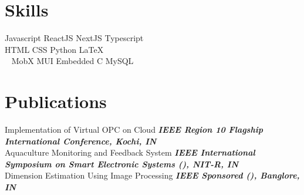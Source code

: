 \documentclass[]{deedy-resume-openfont}
\begin{document}
\begin{minipage}[t]{0.32\textwidth}




\section{Skills}
\vspace{1.5mm}
Javascript \textbullet{}   ReactJS \textbullet{} NextJS \textbullet{} Typescript \\
HTML \textbullet{} CSS \textbullet{} Python \textbullet{} \LaTeX\\\
MobX \textbullet{} MUI \textbullet{} Embedded C \textbullet{} MySQL
\sectionsep

\section{Publications}
Implementation of Virtual OPC on Cloud \textbullet{} 
{\footnotesize \textit{\textbf{ IEEE Region 10 Flagship International Conference, Kochi, IN}}}\\
\vspace{1.5mm}
Aquaculture Monitoring and Feedback System \textbullet{}
{\footnotesize \textit{\textbf{IEEE International Symposium on Smart Electronic Systems (), NIT-R, IN}}}\\
\vspace{1.5mm}
Dimension Estimation Using Image Processing \textbullet{}
{\footnotesize \textit{\textbf{IEEE Sponsored (), Banglore, IN}}}


\end{minipage}
\end{document}
